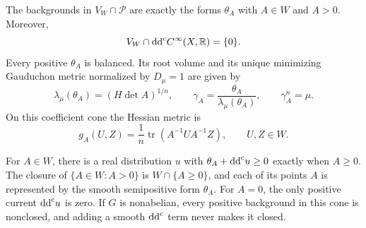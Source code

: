 \begin{proposition}\label{prop:parallelizable-gaud-volume}
The backgrounds in $V_W\cap\mathscr P$ are exactly the forms $\theta_A$ with $A\in W$ and $A>0$. Moreover,
\[
 V_W\cap\mathrm{dd}^{\mathrm{c}} C^\infty(X,\mathbb R)=\{0\}.
\]
Every positive $\theta_A$ is balanced. Its root volume and its unique minimizing Gauduchon metric normalized by $D_\mu=1$ are given by
\begin{equation}\label{eq:parallelizable-gaud-volume}
 \lambda_\mu(\theta_A)=(H\det A)^{1/n},\qquad
 \gamma_A=\frac{\theta_A}{\lambda_\mu(\theta_A)},\qquad
 \gamma_A^n=\mu.
\end{equation}
On this coefficient cone the Hessian metric is
\begin{equation}\label{eq:parallelizable-gaud-hessian}
 g_A(U,Z)=\frac1n\operatorname{tr}(A^{-1}UA^{-1}Z),
 \qquad U,Z\in W.
\end{equation}

For $A\in W$, there is a real distribution $u$ with $\theta_A+\mathrm{dd}^{\mathrm{c}} u\geq0$ exactly when $A\geq0$. The closure of $\{A\in W:A>0\}$ is $W\cap\{A\geq0\}$, and each of its points $A$ is represented by the smooth semipositive form $\theta_A$. For $A=0$, the only positive current $\mathrm{dd}^{\mathrm{c}} u$ is zero. If $G$ is nonabelian, every positive background in this cone is nonclosed, and adding a smooth $\mathrm{dd}^{\mathrm{c}}$ term never makes it closed.
\end{proposition}

